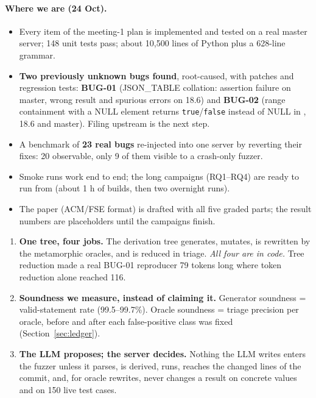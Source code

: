 \paragraph{Where we are (24 Oct).}
\begin{itemize}
  \item Every item of the meeting-1 plan is implemented and tested on a real
    \pg master server; 148 unit tests pass;
    about 10{,}500 lines of Python plus a 628-line grammar.
  \item \textbf{Two previously unknown \pg bugs found}, root-caused, with
    patches and regression tests: \textbf{BUG-01} (JSON\_TABLE collation:
    assertion failure on master, wrong result and spurious errors on 18.6) and
    \textbf{BUG-02} (range containment with a NULL element returns
    \texttt{true}/\texttt{false} instead of NULL in , 18.6 and master).
    Filing upstream is the next step.
  \item A benchmark of \textbf{23 real bugs} re-injected into one server by
    reverting their fixes: 20 observable, only 9 of them visible to a
    crash-only fuzzer.
  \item Smoke runs work end to end; the long campaigns (RQ1--RQ4) are ready to
    run from  (about 1 h of builds, then two
    overnight runs).
  \item The paper (ACM/FSE format) is drafted with all five graded parts;
    the result numbers are placeholders until the campaigns finish.
\end{itemize}

\begin{keybox}
\begin{enumerate}
  \item \textbf{One tree, four jobs.} The derivation tree generates, mutates,
    is rewritten by the metamorphic oracles, and is reduced in triage.
    \emph{All four are in code.} Tree reduction made a real BUG-01 reproducer
    79 tokens long where token reduction alone reached 116.
  \item \textbf{Soundness we measure, instead of claiming it.} Generator
    soundness = valid-statement rate (99.5--99.7\%). Oracle soundness =
    triage precision per oracle, before and after each false-positive class was
    fixed (Section~\ref{sec:ledger}).
  \item \textbf{The LLM proposes; the server decides.} Nothing the LLM writes
    enters the fuzzer unless it parses, is derived, runs, reaches the changed
    lines of the commit, and, for oracle rewrites, never changes a result on
    concrete values and on 150 live test cases.
\end{enumerate}
\end{keybox}

